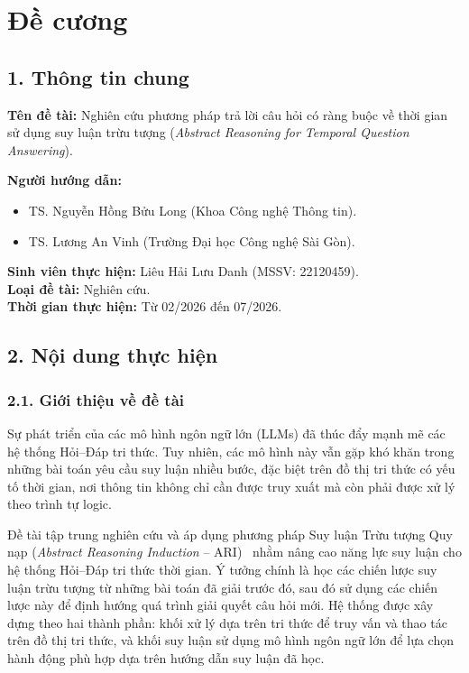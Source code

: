 \chapter*{Đề cương}
\label{proposal}

\section*{1. Thông tin chung}

\noindent
\textbf{Tên đề tài:} Nghiên cứu phương pháp trả lời câu hỏi có ràng buộc về thời gian sử dụng suy
luận trừu tượng (\textit{Abstract Reasoning for Temporal Question Answering}).

\medskip
\noindent
\textbf{Người hướng dẫn:}
\begin{itemize}
  \item TS. Nguyễn Hồng Bửu Long (Khoa Công nghệ Thông tin).
  \item TS. Lương An Vinh (Trường Đại học Công nghệ Sài Gòn).
\end{itemize}

\noindent
\textbf{Sinh viên thực hiện:} Liêu Hải Lưu Danh (MSSV: 22120459).\\
\textbf{Loại đề tài:} Nghiên cứu.\\
\textbf{Thời gian thực hiện:} Từ 02/2026 đến 07/2026.

\section*{2. Nội dung thực hiện}

\subsection*{2.1. Giới thiệu về đề tài}

Sự phát triển của các mô hình ngôn ngữ lớn (LLMs) đã thúc đẩy mạnh mẽ các hệ thống Hỏi--Đáp tri
thức. Tuy nhiên, các mô hình này vẫn gặp khó khăn trong những bài toán yêu cầu suy luận nhiều bước,
đặc biệt trên đồ thị tri thức có yếu tố thời gian, nơi thông tin không chỉ cần được truy xuất mà còn
phải được xử lý theo trình tự logic.

Đề tài tập trung nghiên cứu và áp dụng phương pháp Suy luận Trừu tượng Quy nạp
(\textit{Abstract Reasoning Induction} -- ARI)~\cite{chen2024ari} nhằm nâng cao năng lực suy luận
cho hệ thống Hỏi--Đáp tri thức thời gian. Ý tưởng chính là học các chiến lược suy luận trừu tượng
từ những bài toán đã giải trước đó, sau đó sử dụng các chiến lược này để định hướng quá trình giải
quyết câu hỏi mới. Hệ thống được xây dựng theo hai thành phần: khối xử lý dựa trên tri thức để truy
vấn và thao tác trên đồ thị tri thức, và khối suy luận sử dụng mô hình ngôn ngữ lớn để lựa chọn
hành động phù hợp dựa trên hướng dẫn suy luận đã học.

